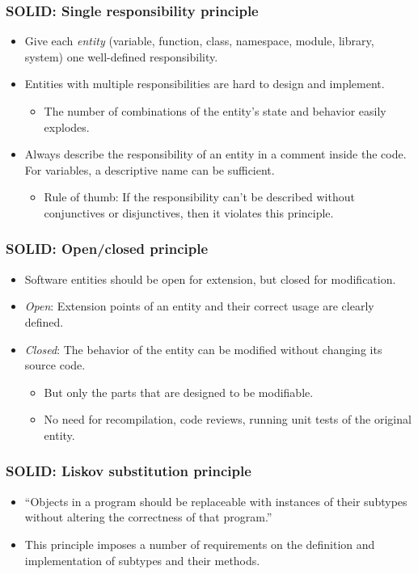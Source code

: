 \begin{frame}
	\frametitle{\alert{S}OLID: Single responsibility principle}
	\begin{itemize}[<+-| highlight@+>]
		\item Give each \emph{entity} (variable, function, class, namespace, module, library, system) \alert{one} well-defined responsibility.
		\item Entities with multiple responsibilities are hard to design and implement.
		\begin{itemize}
			\item The number of combinations of the entity's state and behavior easily explodes.
		\end{itemize}
		\item Always describe the responsibility of an entity in a comment inside the code. For variables, a descriptive name can be sufficient.
		\begin{itemize}
			\item Rule of thumb: If the responsibility can't be described without conjunctives or disjunctives, then it violates this principle.
		\end{itemize}
	\end{itemize}
\end{frame}


\begin{frame}
	\frametitle{S\alert{O}LID: Open/closed principle}
	\begin{itemize}[<+-| highlight@+>]
		\item Software entities should be open for extension, but closed for modification.
		\item \emph{Open}: Extension points of an entity and their correct usage are clearly defined.
		\item \emph{Closed}: The behavior of the entity can be modified without changing its source code.
		\begin{itemize}
			\item But only the parts that are designed to be modifiable.
			\item No need for recompilation, code reviews, running unit tests of the original entity.
		\end{itemize}
	\end{itemize}
\end{frame}


\begin{frame}
	\frametitle{SO\alert{L}ID: Liskov substitution principle}
	\begin{itemize}[<+-| highlight@+>]
		\item ``Objects in a program should be replaceable with instances of their subtypes without altering the correctness of that program.''
		\item This principle imposes a number of requirements on the definition and implementation of subtypes and their methods.
	\end{itemize}
\end{frame}


